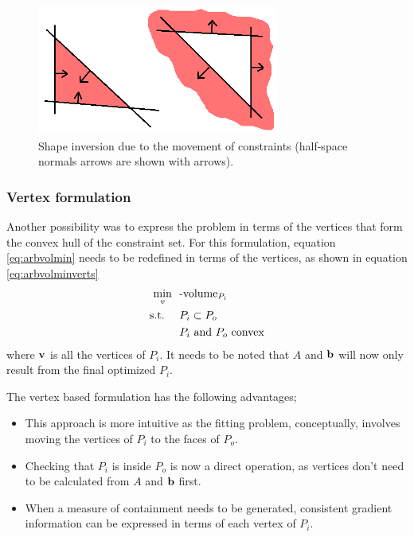 \begin{figure}[htbp]
  \centering
  \includegraphics[width=8cm]{graph/shapeinversion}
  \caption[Shape inversion example]{Shape inversion due to the movement of constraints (half-space normals arrows are shown with arrows).}
  \label{fig:shapeinversion}
\end{figure}

\subsubsection{Vertex formulation}
Another possibility was to express the problem in terms of the vertices that form the convex hull of the constraint set.
For this formulation, equation \ref{eq:arbvolmin} needs to be redefined in terms of the vertices, as shown in equation \ref{eq:arbvolminverts}
\begin{align}
  \label{eq:arbvolminverts}
    \min_{v}~~&\text{-volume}_{P_i}\\
    \text{s.t.}~~~~ &P_i \subset P_o \notag \\
                    &P_i \text{~and~} P_o \text{~convex} \notag
\end{align}
where ${\bf {v}}$ is all the vertices of $P_i$.
It needs to be noted that $A$ and ${\bf {b}}$ will now only result from the final optimized $P_i$.

The vertex based formulation has the following advantages;
\begin{itemize}
  \item This approach is more intuitive as the fitting problem, conceptually, involves moving the vertices of $P_i$ to the faces of $P_o$.
  \item Checking that $P_i$ is inside $P_o$ is now a direct operation, as vertices don't need to be calculated from $A$ and ${\bf {b}}$ first.
  \item When a measure of containment needs to be generated, consistent gradient information can be expressed in terms of each vertex of $P_i$.
\end{itemize}

